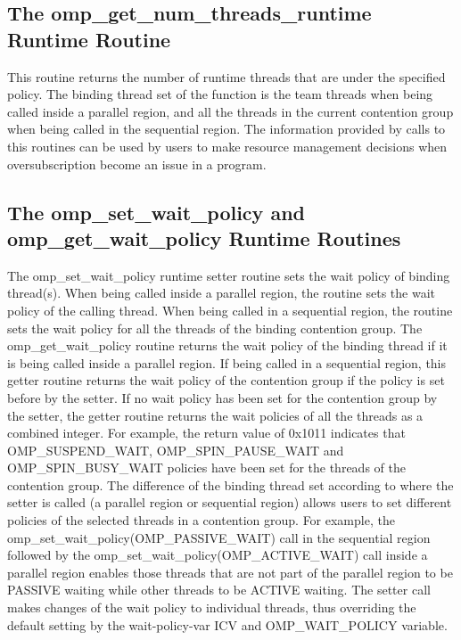 \subsection{The {\sf omp\_get\_num\_threads\_runtime} Runtime Routine}
This routine returns the number of runtime threads that are under the specified policy. The binding thread set 
of the function is the team threads when being called inside a {\sf parallel} region, and all the threads in the current 
contention group when being called in the sequential region. The information provided by calls to this routines can be used 
by users to make resource management decisions when oversubscription become an issue in a program. 

\subsection{The {\sf omp\_set\_wait\_policy} and {\sf omp\_get\_wait\_policy} Runtime Routines}
The {\sf omp\_set\_wait\_policy} runtime setter routine sets the wait policy of binding thread(s). 
When being called inside a {\sf parallel} region, the routine sets the wait policy of the calling thread. 
When being called in a sequential region, the routine sets the wait policy for all the 
 threads of the binding contention group. The {\sf omp\_get\_wait\_policy} routine returns the wait policy 
of the binding thread if it is being called inside a {\sf parallel} region. If being called in a sequential region, 
this getter routine returns the wait policy of the contention group if the policy is set before by the setter. 
If no wait policy has been set for the contention group by the setter, the getter routine returns the wait policies 
of all the threads as a combined integer. For example, the return value of 0x1011 indicates that {\sf OMP\_SUSPEND\_WAIT}, 
{\sf OMP\_SPIN\_PAUSE\_WAIT} and {\sf OMP\_SPIN\_BUSY\_WAIT} policies have been set for the threads of the contention group. The
difference of the binding thread set according to where the setter is called (a {\sf parallel} region or sequential region) 
allows users to set different policies of the selected threads in a contention group. 
For example, the {\sf omp\_set\_wait\_policy(OMP\_PASSIVE\_WAIT)} 
call in the sequential region followed by the {\sf omp\_set\_wait\_policy(OMP\_ACTIVE\_WAIT)}  
call inside a {\sf parallel} region enables those threads that are not part of the {\sf parallel} region to be {\sf PASSIVE} 
waiting while other threads to be {\sf ACTIVE} waiting. 
The setter call makes changes of the wait policy to individual threads, thus overriding the default 
setting by the {\sf wait-policy-var} ICV and {\sf OMP\_WAIT\_POLICY} variable. 

